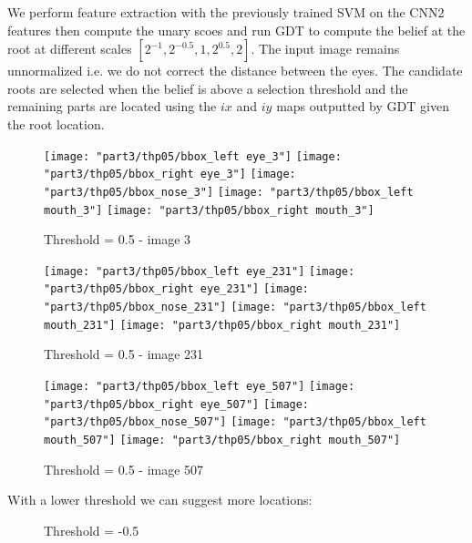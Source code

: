 \documentclass{acmsiggraph}
\newcommand{\1}{\mathbbm{1}}
\begin{document}
	We perform feature extraction with the previously trained SVM on the CNN2 features then compute the unary scoes and run GDT to compute the belief at the root at different scales $[2^{-1}, 2^{-0.5}, 1, 2^{0.5}, 2]$. The input image remains unnormalized i.e. we do not correct the distance between the eyes. The candidate roots are selected when the belief is above a selection threshold and the remaining parts are located using the $ix$ and $iy$ maps outputted by GDT given the root location.
	\begin{figure}[H]
	\centering
	\texttt{[image: "part3/thp05/bbox\_left eye\_3"]}
	\texttt{[image: "part3/thp05/bbox\_right eye\_3"]}
	\texttt{[image: "part3/thp05/bbox\_nose\_3"]}
	\texttt{[image: "part3/thp05/bbox\_left mouth\_3"]}
	\texttt{[image: "part3/thp05/bbox\_right mouth\_3"]}
	\caption{Threshold = 0.5 - image 3} 
	\end{figure}
	\begin{figure}[H]
	\centering
	\texttt{[image: "part3/thp05/bbox\_left eye\_231"]}
	\texttt{[image: "part3/thp05/bbox\_right eye\_231"]}
	\texttt{[image: "part3/thp05/bbox\_nose\_231"]}
	\texttt{[image: "part3/thp05/bbox\_left mouth\_231"]}
	\texttt{[image: "part3/thp05/bbox\_right mouth\_231"]}
	\caption{Threshold = 0.5 - image 231} 
	\end{figure}
	\begin{figure}[H]
	\centering
	\texttt{[image: "part3/thp05/bbox\_left eye\_507"]}
	\texttt{[image: "part3/thp05/bbox\_right eye\_507"]}
	\texttt{[image: "part3/thp05/bbox\_nose\_507"]}
	\texttt{[image: "part3/thp05/bbox\_left mouth\_507"]}
	\texttt{[image: "part3/thp05/bbox\_right mouth\_507"]}
	\caption{Threshold = 0.5 - image 507} 
	\end{figure}

	With a lower threshold we can suggest more locations:
	\begin{figure}[H]
	\centering
	\hspace{3pt}
	\hspace{3pt}
	\end{figure}
	\begin{figure}[H]
	\centering
	\hspace{3pt}
	\hspace{3pt}
	\caption{Threshold = -0.5} 
	\end{figure}
\end{document}
